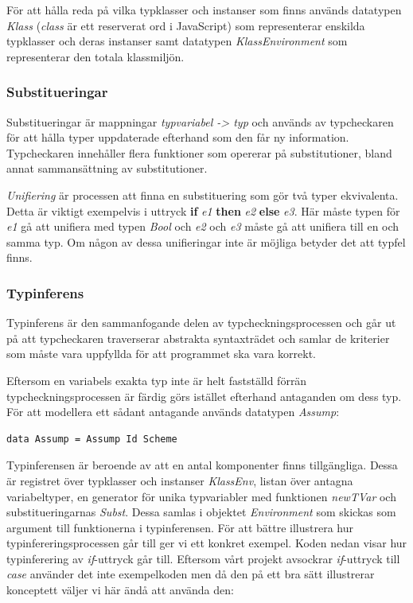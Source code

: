 För att hålla reda på vilka typklasser och instanser som finns används datatypen \emph{Klass} (\emph{class} är ett reserverat ord i JavaScript) som representerar enskilda typklasser och deras instanser samt datatypen \emph{KlassEnvironment} som representerar den totala klassmiljön.


\subsubsection{Substitueringar}
Substitueringar är mappningar \emph{typvariabel -> typ} och används av typcheckaren
för att hålla typer uppdaterade efterhand som den får ny
information. Typcheckaren innehåller flera funktioner som opererar på
substitutioner, bland annat sammansättning av substitutioner.  %

\emph{Unifiering} är processen att finna en substituering som gör två typer ekvivalenta. Detta är viktigt exempelvis i uttryck {\bf if} \emph{e1} {\bf then} \emph{e2} {\bf else} \emph{e3}. Här måste typen för \emph{e1} gå att unifiera med typen \emph{Bool} och \emph{e2} och \emph{e3} måste gå att unifiera till en och samma typ. Om någon av dessa unifieringar inte är möjliga betyder det att typfel finns.

\subsubsection{Typinferens}
Typinferens är den sammanfogande delen av typcheckningsprocessen och går ut på att typcheckaren traverserar abstrakta syntaxträdet och samlar de kriterier som måste vara uppfyllda för att programmet ska vara korrekt.

Eftersom en variabels exakta typ inte är helt fastställd förrän typcheckningsprocessen är färdig görs istället efterhand antaganden om dess typ. För att modellera ett sådant antagande används datatypen \emph{Assump}:
\begin{lstlisting}
data Assump = Assump Id Scheme
\end{lstlisting}

Typinferensen är beroende av att en antal komponenter finns tillgängliga. Dessa är registret över typklasser och instanser \emph{KlassEnv}, listan över antagna variabeltyper, en generator för unika typvariabler med funktionen \emph{newTVar} och substitueringarnas \emph{Subst}. Dessa samlas i objektet \emph{Environment} som skickas som argument till funktionerna i typinferensen. 
För att bättre illustrera hur typinfereringsprocessen går till ger vi ett konkret exempel. Koden nedan visar hur typinferering av \emph{if}-uttryck går till. Eftersom vårt projekt avsockrar \emph{if}-uttryck till \emph{case} använder det inte exempelkoden men då den på ett bra sätt illustrerar konceptett väljer vi här ändå att använda den:

